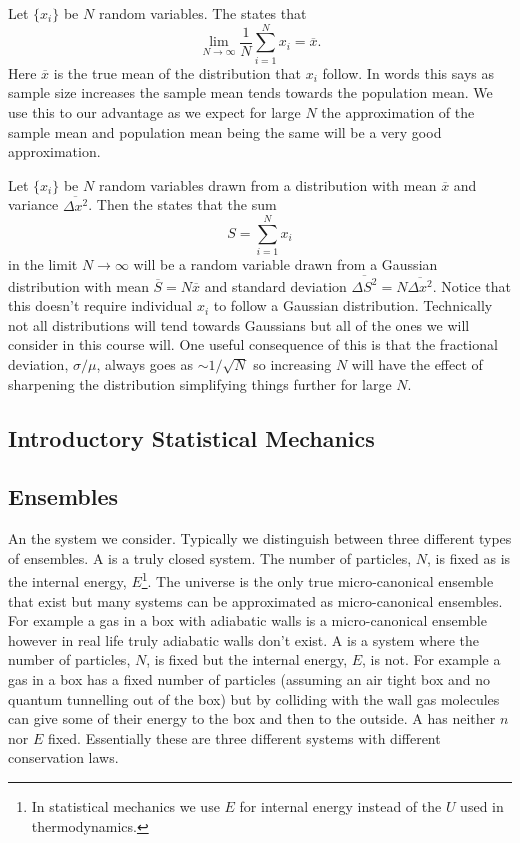 \documentclass[a4paper]{article}
\newcommand{\mean}[1]{\overline{#1}}
\begin{document}
    Let \(\{x_i\}\) be \(N\) random variables.
    The  states that
    \[\lim_{N\to\infty} \frac{1}{N}\sum_{i=1}^{N} x_i = \mean{x}.\]
    Here \(\mean{x}\) is the true mean of the distribution that \(x_i\) follow.
    In words this says as sample size increases the sample mean tends towards the population mean.
    We use this to our advantage as we expect for large \(N\) the approximation of the sample mean and population mean being the same will be a very good approximation.
    
    Let \(\{x_i\}\) be \(N\) random variables drawn from a distribution with mean \(\mean{x}\) and variance \(\mean{\Delta x^2}\).
    Then the  states that the sum
    \[S = \sum_{i=1}^{N} x_i\]
    in the limit \(N \to \infty\) will be a random variable drawn from a Gaussian distribution with mean \(\mean{S} = N\mean{x}\) and standard deviation \(\mean{\Delta S^2} = N\mean{\Delta x^2}\).
    Notice that this doesn't require individual \(x_i\) to follow a Gaussian distribution.
    Technically not all distributions will tend towards Gaussians but all of the ones we will consider in this course will.
    One useful consequence of this is that the fractional deviation, \(\sigma/\mu\), always goes as \(\sim 1/\sqrt{N}\) so increasing \(N\) will have the effect of sharpening the distribution simplifying things further for large \(N\).
    
    \subsection{Introductory Statistical Mechanics}
    \subsection{Ensembles}
    An  the system we consider.
    Typically we distinguish between three different types of ensembles.
    A  is a truly closed system.
    The number of particles, \(N\), is fixed as is the internal energy, \(E\)\footnote{In statistical mechanics we use \(E\) for internal energy instead of the \(U\) used in thermodynamics.}.
    The universe is the only true micro-canonical ensemble that exist but many systems can be approximated as micro-canonical ensembles.
    For example a gas in a box with adiabatic walls is a micro-canonical ensemble however in real life truly adiabatic walls don't exist.
    A  is a system where the number of particles, \(N\), is fixed but the internal energy, \(E\), is not.
    For example a gas in a box has a fixed number of particles (assuming an air tight box and no quantum tunnelling out of the box) but by colliding with the wall gas molecules can give some of their energy to the box and then to the outside.
    A  has neither \(n\) nor \(E\) fixed.
    Essentially these are three different systems with different conservation laws.
    
\end{document}

